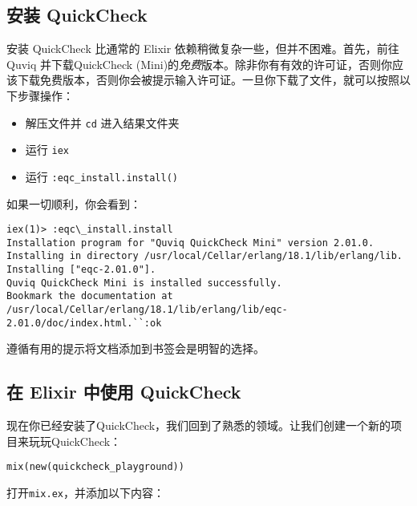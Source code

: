 \subsection{安装 QuickCheck}

安装 QuickCheck 比通常的 Elixir 依赖稍微复杂一些，但并不困难。首先，前往
Quviq 并下载QuickCheck (Mini)的\emph{免费}版本。除非你有有效的许可证，否则你应该下载免费版本，否则你会被提示输入许可证。一旦你下载了文件，就可以按照以下步骤操作：

\begin{itemize}
	\item 解压文件并 \texttt{cd} 进入结果文件夹
	\item 运行 \texttt{iex}
	\item 运行 \texttt{:eqc\_install.install()}
\end{itemize}

如果一切顺利，你会看到：

\begin{code}{}
\begin{verbatim}
iex(1)> :eqc\_install.install
Installation program for "Quviq QuickCheck Mini" version 2.01.0.
Installing in directory /usr/local/Cellar/erlang/18.1/lib/erlang/lib.
Installing ["eqc-2.01.0"].
Quviq QuickCheck Mini is installed successfully.
Bookmark the documentation at /usr/local/Cellar/erlang/18.1/lib/erlang/lib/eqc-2.01.0/doc/index.html.``:ok
\end{verbatim}
\end{code}

遵循有用的提示将文档添加到书签会是明智的选择。

\subsection{在 Elixir 中使用 QuickCheck}

现在你已经安装了QuickCheck，我们回到了熟悉的领域。让我们创建一个新的项目来玩玩QuickCheck：

\begin{verbatim}
mix(new(quickcheck_playground))
\end{verbatim}

打开\texttt{mix.ex}，并添加以下内容：

